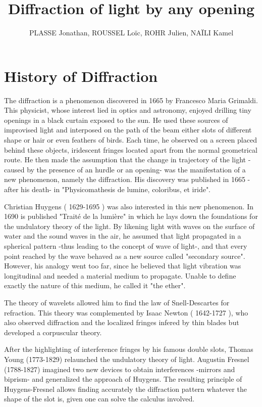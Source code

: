 \documentclass[10pt,a4paper]{article}
\title{Diffraction of light by any opening}
\author{PLASSE Jonathan, ROUSSEL Loïc, ROHR Julien, NAÏLI Kamel}
\begin{document}
\maketitle

\section{History of Diffraction}
The diffraction is a phenomenon discovered in 1665 by Francesco Maria Grimaldi. This physicist, whose interest lied in optics and astronomy, enjoyed drilling tiny openings in a black curtain exposed to the sun. He used these sources of improvised light and interposed on the path of the beam either slots of different shape or hair or even feathers of birds. Each time, he observed on a screen placed behind these objects, iridescent fringes located apart from the normal geometrical route. He then made the assumption that the change in trajectory of the light -caused by the presence of an hurdle or an opening- was the manifestation of a new phenomenon, namely the diffraction. His discovery was published in 1665 -after his death- in "Physicomathesis de lumine, coloribus, et iride".

Christian Huygens ( 1629-1695 ) was also interested in this new phenomenon. In 1690 is published "Trait\'e de la lumi\`ere" in which he lays down the foundations for the undulatory theory of the light. By likening light with waves on the surface of water and the sound waves in the air, he assumed that light propagated in a spherical pattern -thus leading to the concept of wave of light-, and that every point reached by the wave behaved as a new source called "secondary source". However, his analogy went too far, since he believed that light vibration was longitudinal and needed a material medium to propagate. Unable to define exactly the nature of this medium, he called it "the ether". 

The theory of wavelets allowed him to find the law of Snell-Descartes for refraction. This theory was complemented by Isaac Newton ( 1642-1727 ), who also observed diffraction and the localized fringes infered by thin blades but developed a corpuscular theory. 

After the highlighting of interference fringes by his famous double slots, Thomas Young (1773-1829) relaunched the undulatory theory of light. Augustin Fresnel (1788-1827) imagined two new devices to obtain interferences -mirrors and biprism- and generalized the approach of Huygens. The resulting principle of Huygens-Fresnel allows finding accurately the diffraction pattern whatever the shape of the slot is, given one can solve the calculus involved. 
\end{document}
